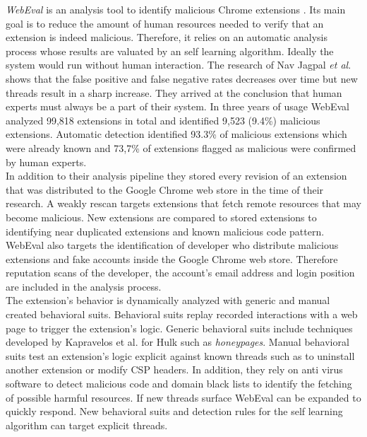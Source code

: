 	\textit{WebEval} is an analysis tool to identify malicious Chrome extensions \cite{190984}. Its main goal is to reduce the amount of human resources needed to verify that an extension is indeed malicious. Therefore, it relies on an automatic analysis process whose results are valuated by an self learning algorithm. Ideally the system would run without human interaction. The research of Nav Jagpal \textit{et al}. shows that the false positive and false negative rates decreases over time but new threads result in a sharp increase. They arrived at the conclusion that human experts must always be a part of their system. In three years of usage WebEval analyzed 99,818 extensions in total and identified 9,523 (9.4\%) malicious extensions. Automatic detection identified 93.3\% of malicious extensions which were already known and 73,7\% of extensions flagged as malicious were confirmed by human experts. \\
	In addition to their analysis pipeline they stored every revision of an extension that was distributed to the Google Chrome web store in the time of their research. A weakly rescan targets extensions that fetch remote resources that may become malicious. New extensions are compared to stored extensions to identifying near duplicated extensions and known malicious code pattern. WebEval also targets the identification of developer who distribute malicious extensions and fake accounts inside the Google Chrome web store. Therefore reputation scans of the developer, the account's email address and login position are included in the analysis process.  \\
	The extension's behavior is dynamically analyzed with generic and manual created behavioral suits. Behavioral suits replay recorded interactions with a web page to trigger the extension's logic. Generic behavioral suits include techniques developed by Kapravelos	et al. for Hulk \cite{184485} such as \textit{honeypages}. Manual behavioral suits test an extension's logic explicit against known threads such as to uninstall another extension or modify CSP headers. In addition, they rely on anti virus software to detect malicious code and domain black lists to identify the fetching of possible harmful resources. If new threads surface WebEval can be expanded to quickly respond. New behavioral suits and detection rules for the self learning algorithm can target explicit threads. \\
	
